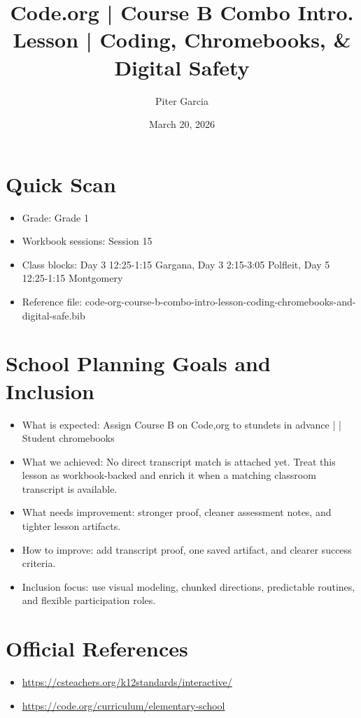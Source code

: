 \documentclass[11pt]{article}
\title{Code.org | Course B Combo Intro. Lesson | Coding, Chromebooks, & Digital Safety}
\author{Piter Garcia}
\date{March 20, 2026}
\begin{document}
    \maketitle
    \section*{Quick Scan}
    \begin{itemize}[leftmargin=*]
    \item Grade: Grade 1
    \item Workbook sessions: Session 15
    \item Class blocks: Day 3 12:25-1:15 Gargana, Day 3 2:15-3:05 Polfleit, Day 5 12:25-1:15 Montgomery
    \item Reference file: code-org-course-b-combo-intro-lesson-coding-chromebooks-and-digital-safe.bib
    \end{itemize}
    \section*{School Planning Goals and Inclusion}
    \begin{itemize}[leftmargin=*]
    \item What is expected: Assign Course B on Code,org to stundets in advance | | Student chromebooks
    \item What we achieved: No direct transcript match is attached yet. Treat this lesson as workbook-backed and enrich it when a matching classroom transcript is available.
    \item What needs improvement: stronger proof, cleaner assessment notes, and tighter lesson artifacts.
    \item How to improve: add transcript proof, one saved artifact, and clearer success criteria.
    \item Inclusion focus: use visual modeling, chunked directions, predictable routines, and flexible participation roles.
    \end{itemize}
    \section*{Official References}
    \begin{itemize}[leftmargin=*]
    \item \url{https://csteachers.org/k12standards/interactive/}
\item \url{https://code.org/curriculum/elementary-school}

    \end{itemize}
    
\end{document}

